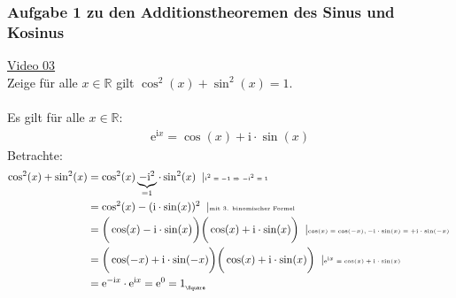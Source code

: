 \subsubsection{ Aufgabe 1 zu den Additionstheoremen des Sinus und Kosinus}
\href{https://youtu.be/fVSPz-IaCqA}{Video 03}\\
Zeige für alle $ x\in\mathbb{R} $ gilt $ \cos^2(x)+\sin^2(x) =1$.\\ \\
Es gilt für alle $ x\in\mathbb{R} $:\\
\begin{align*}
\mathrm{e}^{\mathrm{i}x}=\cos(x)+\mathrm{i}\cdot\sin(x)
\end{align*}
Betrachte:\\
\begin{align*}
\cos^2(x)+\sin^2(x)&= \cos^2(x)\underbrace {-\mathrm{i^2}}_{=1}\cdot \sin^2(x)\;\;|\text{\tiny $\mathrm{i}^2=-1\Rightarrow -\mathrm{i}^2=1$ }\\
&=\cos^2(x)-(\mathrm{i}\cdot \sin(x))^2\;\;|\text{\tiny mit 3. binomischer Formel }\\
&=\bigg(\cos(x)-\mathrm{i}\cdot \sin(x\big)\bigg)\bigg(\cos(x)+\mathrm{i}\cdot \sin(x)\bigg)\;\;|\text{\tiny $ \cos(x)=\cos(-x),-\mathrm{i}\cdot \sin(x)=+\mathrm{i}\cdot\sin(-x) $ }\\
&=\bigg(\cos(-x)+\mathrm{i}\cdot\sin(-x)\bigg)\bigg(\cos(x)+\mathrm{i}\cdot \sin(x)\bigg)\;\;|\text{\tiny $\mathrm{e}^{\mathrm{i}x}=\cos(x)+\mathrm{i}\cdot\sin(x)  $}\\
&=\mathrm{e}^{-\mathrm{i}x}\cdot\mathrm{e}^{\mathrm{i}x}=\mathrm{e}^0=1_{_{\Square}}
\end{align*}
